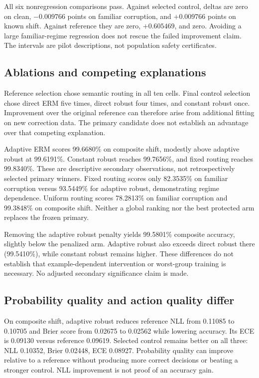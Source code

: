 All six nonregression comparisons pass. Against selected control, deltas are
zero on clean, $-0.009766$ points on familiar corruption, and $+0.009766$ points
on known shift. Against reference they are zero, $+0.605469$, and zero. Avoiding
a large familiar-regime regression does not rescue the failed improvement
claim. The intervals are pilot descriptions, not population safety certificates.




\subsection{Ablations and competing explanations}
Reference selection chose semantic routing in all ten cells. Final control
selection chose direct ERM five times, direct robust four times, and constant
robust once. Improvement over the original reference can therefore arise from
additional fitting on new correction data. The primary candidate does not
establish an advantage over that competing explanation.

Adaptive ERM scores 99.6680\% on composite shift, modestly above adaptive robust
at 99.6191\%. Constant robust reaches 99.7656\%, and fixed routing reaches
99.8340\%. These are descriptive secondary observations, not retrospectively
selected primary winners. Fixed routing scores only 82.3535\% on familiar
corruption versus 93.5449\% for adaptive robust, demonstrating regime dependence.
Uniform routing scores 78.2813\% on familiar corruption and 99.3848\% on composite
shift. Neither a global ranking nor the best protected arm replaces the
frozen primary.

Removing the adaptive robust penalty yields 99.5801\% composite accuracy,
slightly below the penalized arm. Adaptive robust also exceeds direct robust
there (99.5410\%), while constant robust remains higher. These differences do
not establish that example-dependent intervention or worst-group training is
necessary. No adjusted secondary significance claim is made.

\subsection{Probability quality and action quality differ}
On composite shift, adaptive robust reduces reference NLL from 0.11085 to
0.10705 and Brier score from 0.02675 to 0.02562 while lowering accuracy. Its ECE
is 0.09130 versus reference 0.09619. Selected control remains better on all
three: NLL 0.10352, Brier 0.02448, ECE 0.08927. Probability quality can improve
relative to a reference without producing more correct decisions or beating a
stronger control. NLL improvement is not proof of an accuracy gain.

